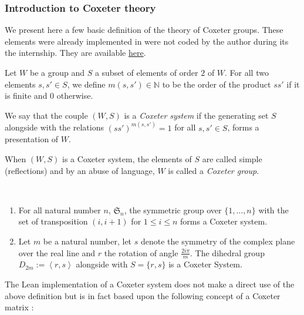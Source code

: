 \subsubsection{Introduction to Coxeter theory}

We present here a few basic definition of the theory of Coxeter groups. These elements were already implemented in \Mathlib were not coded by the author during its the internship. They are available \href{https://github.com/leanprover-community/mathlib4/tree/5dccde47166d00d485a5d6ad8cc3cb4431edcb38/Mathlib/GroupTheory/Coxeter}{here}. 

Let $W$ be a group and $S$ a subset of elements of order $2$ of $W$.
For all two elements $s, s' \in  S$, we define $m(s,s') \in  \mathbb{N}$ to be the order of the product $ss'$ if it is finite and $0$ otherwise.

\begin{definition}
    We say that the couple $(W,S)$ is a \emph{Coxeter system} if the generating set $S$ alongside with the relations $(ss')^{m\left( s,s' \right)} = 1$ for all $s,s' \in S$, forms a presentation of $W$.
\end{definition}

When $\left( W,S \right)$ is a Coxeter system, the elements of $S$ are called simple (reflections) and by an abuse of language, $W$ is called a \emph{Coxeter group}.

\begin{ex}\

    \begin{enumerate}
        \item  For all natural number $n$, $\mathfrak{S}_n$, the symmetric group over $\{1,\ldots,n\}$ with the set of transposition $(i,i+1)$ for $1\le i \le n $ forms a Coxeter system.
        \item Let $m$ be a natural number, let $s$ denote the symmetry of the complex plane over the real line and $r$ the rotation of angle $\frac{2i \pi}{m}$. The dihedral group $D_{2m} := \left<r,s\right>$ alongside with $S= \{r,s\}$ is a Coxeter System. 
    \end{enumerate}
\end{ex}

The Lean implementation  of a Coxeter system does not make a direct use of the above definition but is in fact based upon the following concept of a Coxeter matrix :

